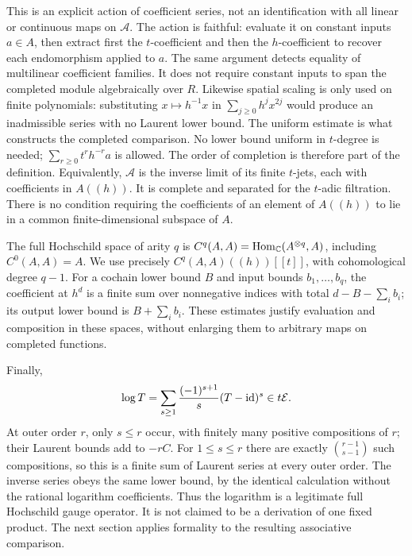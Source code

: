 This is an explicit action of coefficient series, not an
identification with all linear or continuous maps on $\mathcal A$.
The action is faithful: evaluate it on constant inputs $a\in A$,
then extract first the $t$-coefficient and then the
$h$-coefficient to recover each endomorphism applied to $a$.
The same argument detects equality of multilinear coefficient
families. It does not require constant inputs to span the completed
module algebraically over $R$.
Likewise spatial scaling is only used on finite polynomials:
substituting $x\mapsto h^{-1}x$ in
$\sum_{j\geq0}h^jx^{2j}$ would produce an inadmissible
series with no Laurent lower bound. The uniform estimate is what
constructs the completed comparison. No lower bound uniform in
$t$-degree is needed; $\sum_{r\geq0}t^rh^{-r}a$ is allowed.
The order of completion is therefore part of the definition.
Equivalently, $\mathcal A$ is the inverse limit of its finite
$t$-jets, each with coefficients in $A((h))$. It is complete
and separated for the $t$-adic filtration. There is no condition
requiring the coefficients of an element of $A((h))$ to
lie in a common finite-dimensional subspace of $A$.

The full Hochschild space of arity $q$ is
$C^q(A,A)=\operatorname{Hom}_\mathbb C(A^{\otimes q},A)$, including $C^0(A,A)=A$.
We use precisely
$C^q(A,A)((h))[[t]]$, with cohomological degree $q-1$.
For a cochain lower bound $B$ and input bounds $b_1,\ldots,b_q$,
the coefficient at $h^d$ is a finite sum over nonnegative
indices with total $d-B-\sum_i b_i$; its output lower bound is
$B+\sum_i b_i$. These estimates justify evaluation and composition
in these spaces, without enlarging them to arbitrary maps on
completed functions.

Finally,
\[
 \log T=\sum_{s\geq1}\frac{(-1)^{s+1}}s(T-\operatorname{id})^s
 \in t\mathcal E.
\]
At outer order $r$, only $s\leq r$ occur, with finitely many
positive compositions of $r$; their Laurent bounds add to $-rC$.
For $1\leq s\leq r$ there are exactly
$\binom{r-1}{s-1}$ such compositions, so this is a finite sum of
Laurent series at every outer order. The inverse series obeys
the same lower bound, by the identical calculation without
the rational logarithm coefficients.
Thus the logarithm is a legitimate full Hochschild gauge operator.
It is not claimed to be a derivation of one fixed product.
The next section applies formality to the resulting associative
comparison.
